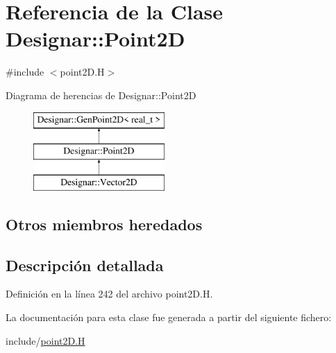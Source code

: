 \hypertarget{class_designar_1_1_point2_d}{}\section{Referencia de la Clase Designar\+:\+:Point2D}
\label{class_designar_1_1_point2_d}


{\ttfamily \#include $<$point2\+D.\+H$>$}

Diagrama de herencias de Designar\+:\+:Point2D\begin{figure}[H]
\begin{center}
\leavevmode
\includegraphics[height=3.000000cm]{class_designar_1_1_point2_d}
\end{center}
\end{figure}
\subsection*{Otros miembros heredados}


\subsection{Descripción detallada}


Definición en la línea 242 del archivo point2\+D.\+H.



La documentación para esta clase fue generada a partir del siguiente fichero\+:\begin{DoxyCompactItemize}
\item 
include/\hyperlink{point2_d_8_h}{point2\+D.\+H}\end{DoxyCompactItemize}
